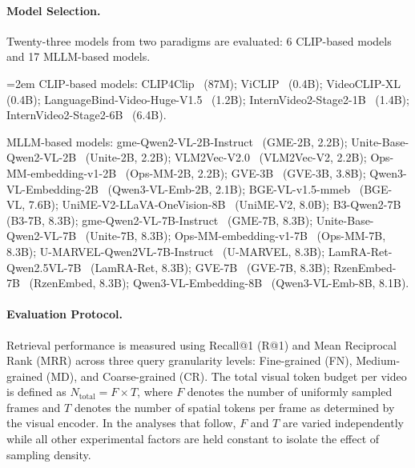 \paragraph{Model Selection.}
Twenty-three models from two paradigms are evaluated: 6 CLIP-based models and 17 MLLM-based models.

\begingroup\emergencystretch=2em
CLIP-based models:
CLIP4Clip~\cite{luo2022clip4clip} (87M);
ViCLIP~\cite{wang2023internvid} (0.4B);
VideoCLIP-XL~\cite{wang2024videoclip} (0.4B);
LanguageBind-Video-Huge-V1.5~\cite{zhu2024languagebind} (1.2B);
InternVideo2-Stage2-1B~\cite{wang2024internvideo2} (1.4B);
InternVideo2-Stage2-6B~\cite{wang2024internvideo2} (6.4B).

MLLM-based models:
gme-Qwen2-VL-2B-Instruct~\cite{Zhang_2025_CVPR} (GME-2B, 2.2B);
Unite-Base-Qwen2-VL-2B~\cite{kong2025modality} (Unite-2B, 2.2B);
VLM2Vec-V2.0~\cite{meng2025vlm2vec} (VLM2Vec-V2, 2.2B);
Ops-MM-embedding-v1-2B~\cite{ops} (Ops-MM-2B, 2.2B);
GVE-3B~\cite{guo2025gve} (GVE-3B, 3.8B);
Qwen3-VL-Embedding-2B~\cite{qwen3vlembedding} (Qwen3-VL-Emb-2B, 2.1B);
BGE-VL-v1.5-mmeb~\cite{zhou2024megapairs} (BGE-VL, 7.6B);
UniME-V2-LLaVA-OneVision-8B~\cite{gu2025unime} (UniME-V2, 8.0B);
B3-Qwen2-7B~\cite{thirukovalluru2025breaking} (B3-7B, 8.3B);
gme-Qwen2-VL-7B-Instruct~\cite{Zhang_2025_CVPR} (GME-7B, 8.3B);
Unite-Base-Qwen2-VL-7B~\cite{kong2025modality} (Unite-7B, 8.3B);
Ops-MM-embedding-v1-7B~\cite{ops} (Ops-MM-7B, 8.3B);
U-MARVEL-Qwen2VL-7B-Instruct~\cite{li2026umarvel} (U-MARVEL, 8.3B);
LamRA-Ret-Qwen2.5VL-7B~\cite{liu2025lamra} (LamRA-Ret, 8.3B);
GVE-7B~\cite{guo2025gve} (GVE-7B, 8.3B);
RzenEmbed-7B~\cite{jian2025rzenembed} (RzenEmbed, 8.3B);
Qwen3-VL-Embedding-8B~\cite{qwen3vlembedding} (Qwen3-VL-Emb-8B, 8.1B).
\par\endgroup

\paragraph{Evaluation Protocol.}
Retrieval performance is measured using Recall@1 (R@1) and Mean Reciprocal Rank (MRR) across three query granularity levels: Fine-grained (FN), Medium-grained (MD), and Coarse-grained (CR). The total visual token budget per video is defined as $N_{\text{total}} = F \times T$, where $F$ denotes the number of uniformly sampled frames and $T$ denotes the number of spatial tokens per frame as determined by the visual encoder. In the analyses that follow, $F$ and $T$ are varied independently while all other experimental factors are held constant to isolate the effect of sampling density.

